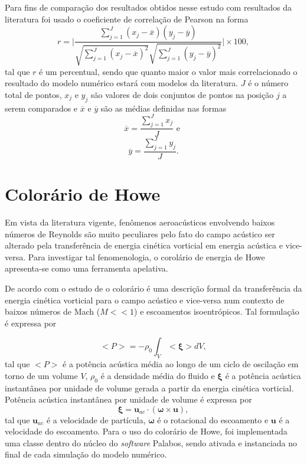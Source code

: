 Para fins de comparação dos resultados obtidos nesse estudo com resultados da literatura foi usado o coeficiente de correlação de Pearson na forma
\begin{equation}
  r = \Bigg|\frac{\sum_{j=1}^{J} (x_{j} - \overline{x})(y_{j} - \overline{y})}{\sqrt{\sum_{j=1}^{J} (x_{j} - \overline{x})^{2}} \sqrt{\sum_{j=1}^{J} (y_{j} - \overline{y})^{2}}}\Bigg| \times 100,
  \label{eq:correlacao}
\end{equation}
tal que $r$ é um percentual, sendo que quanto maior o valor mais correlacionado o resultado do modelo numérico estará com modelos da literatura. $J$ é o número total de pontos, $x_{j}$ e $y_{j}$ são valores de dois conjuntos de pontos na posição $j$ a serem comparados e $\overline{x}$ e $\overline{y}$ são as médias definidas nas formas
\begin{equation}
  \overline{x} = \frac{\sum_{j=1}^{J} x_{j}}{J} \text{ e }
\end{equation}
\begin{equation}
  \overline{y} = \frac{\sum_{j=1}^{J} y_{j}}{J}. 
\end{equation}

\section{Colorário de Howe}

Em vista da literatura vigente, fenômenos aeroacústicos envolvendo baixos números de Reynolds são muito peculiares pelo fato do campo acústico ser alterado pela transferência de energia cinética vorticial em energia acústica e vice-versa. Para investigar tal fenomenologia, o corolário de energia de Howe apresenta-se como uma ferramenta apelativa.

De acordo com o estudo de  o colorário é uma descrição formal da transferência da energia cinética vorticial para o campo acústico e vice-versa num contexto de baixos números de Mach ($M << 1$) e escoamentos isoentrópicos. Tal formulação é expressa por 

\begin{equation}
  <P> = -\rho_{0}\int_{V}< \boldsymbol{\xi} > dV,
\end{equation}
tal que $<P>$ é a potência acústica média ao longo de um ciclo de oscilação em torno de um volume $V$, $\rho_{0}$ é a densidade média do fluido e $\boldsymbol{\xi}$ é a potência acústica instantânea por unidade de volume gerada a partir da energia cinética vorticial. Potência acústica instantânea por unidade de volume é expressa por 
\begin{equation}
  \boldsymbol{\xi} = \textbf{u}_{ac} \cdot ( \boldsymbol{\omega} \times \textbf{u}),
\end{equation}
tal que $\textbf{u}_{ac}$ é a velocidade de partícula, $\boldsymbol{\omega}$ é o rotacional do escoamento e $\textbf{u}$ é a velocidade do escoamento. Para o uso do colorário de Howe, foi implementada uma classe dentro do núcleo do \textit{software} Palabos, sendo ativada e instanciada no final de cada simulação do modelo numérico.     